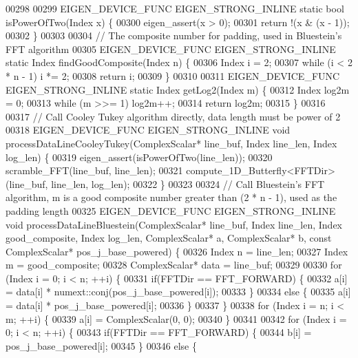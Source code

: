 \begin{DoxyCode}
00298 
00299   EIGEN\_DEVICE\_FUNC EIGEN\_STRONG\_INLINE \textcolor{keyword}{static} \textcolor{keywordtype}{bool} isPowerOfTwo(Index x) \{
00300     eigen\_assert(x > 0);
00301     \textcolor{keywordflow}{return} !(x & (x - 1));
00302   \}
00303 
00304   \textcolor{comment}{// The composite number for padding, used in Bluestein's FFT algorithm}
00305   EIGEN\_DEVICE\_FUNC EIGEN\_STRONG\_INLINE \textcolor{keyword}{static} Index findGoodComposite(Index n) \{
00306     Index i = 2;
00307     \textcolor{keywordflow}{while} (i < 2 * n - 1) i *= 2;
00308     \textcolor{keywordflow}{return} i;
00309   \}
00310 
00311   EIGEN\_DEVICE\_FUNC EIGEN\_STRONG\_INLINE \textcolor{keyword}{static} Index getLog2(Index m) \{
00312     Index log2m = 0;
00313     \textcolor{keywordflow}{while} (m >>= 1) log2m++;
00314     \textcolor{keywordflow}{return} log2m;
00315   \}
00316 
00317   \textcolor{comment}{// Call Cooley Tukey algorithm directly, data length must be power of 2}
00318   EIGEN\_DEVICE\_FUNC EIGEN\_STRONG\_INLINE \textcolor{keywordtype}{void} processDataLineCooleyTukey(ComplexScalar* line\_buf, Index 
      line\_len, Index log\_len) \{
00319     eigen\_assert(isPowerOfTwo(line\_len));
00320     scramble\_FFT(line\_buf, line\_len);
00321     compute\_1D\_Butterfly<FFTDir>(line\_buf, line\_len, log\_len);
00322   \}
00323 
00324   \textcolor{comment}{// Call Bluestein's FFT algorithm, m is a good composite number greater than (2 * n - 1), used as the
       padding length}
00325   EIGEN\_DEVICE\_FUNC EIGEN\_STRONG\_INLINE \textcolor{keywordtype}{void} processDataLineBluestein(ComplexScalar* line\_buf, Index 
      line\_len, Index good\_composite, Index log\_len, ComplexScalar* a, ComplexScalar* b, \textcolor{keyword}{const} ComplexScalar* 
      pos\_j\_base\_powered) \{
00326     Index n = line\_len;
00327     Index m = good\_composite;
00328     ComplexScalar* data = line\_buf;
00329 
00330     \textcolor{keywordflow}{for} (Index i = 0; i < n; ++i) \{
00331       \textcolor{keywordflow}{if}(FFTDir == FFT\_FORWARD) \{
00332         a[i] = data[i] * numext::conj(pos\_j\_base\_powered[i]);
00333       \}
00334       \textcolor{keywordflow}{else} \{
00335         a[i] = data[i] * pos\_j\_base\_powered[i];
00336       \}
00337     \}
00338     \textcolor{keywordflow}{for} (Index i = n; i < m; ++i) \{
00339       a[i] = ComplexScalar(0, 0);
00340     \}
00341 
00342     \textcolor{keywordflow}{for} (Index i = 0; i < n; ++i) \{
00343       \textcolor{keywordflow}{if}(FFTDir == FFT\_FORWARD) \{
00344         b[i] = pos\_j\_base\_powered[i];
00345       \}
00346       \textcolor{keywordflow}{else} \{

\end{DoxyCode}
